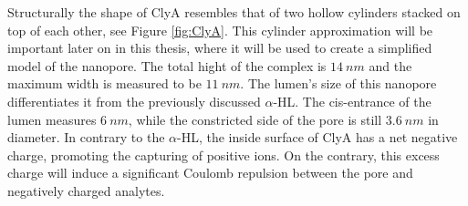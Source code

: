 Structurally the shape of ClyA resembles that of two hollow cylinders stacked on top of
each other, see Figure \ref{fig:ClyA}. This cylinder approximation will be important
later on in this thesis, where
it will be used to create a simplified model of the nanopore. The total hight of the
complex is $14\ nm$ and the maximum width is measured to be $11\ nm$. The lumen's size of
this
nanopore differentiates it from the previously discussed $\alpha$-HL. The cis-entrance of
the lumen measures $6\ nm$, while the constricted side of the pore is still $3.6\ nm$ in
diameter.  In contrary to the $\alpha$-HL, the inside surface of ClyA has a net negative
charge, promoting the capturing of positive ions. On the contrary, this excess charge
will induce a significant Coulomb repulsion between the pore and negatively charged
analytes.

